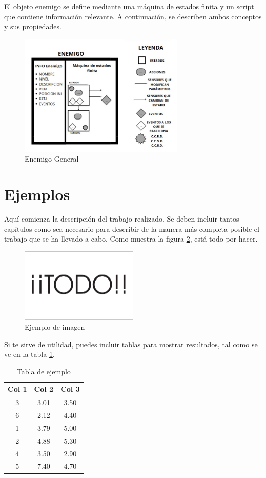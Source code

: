 El objeto enemigo se define mediante una máquina de estados finita y un script que contiene información relevante. A continuación, se describen ambos conceptos y sus propiedades.\\
\begin{figure}[h]
	\centering
	\includegraphics[width = 0.7\textwidth]{Imagenes/EnemigoGeneral.png}
	\caption{Enemigo General }
	\label{fig:EnemigoGeneral}
\end{figure}


\section{Ejemplos}
Aquí comienza la descripción del trabajo realizado. Se deben incluir tantos capítulos como sea necesario para describir de la manera más completa posible el trabajo que se ha llevado a cabo. Como muestra la figura \ref{fig:sampleImage}, está todo por hacer.


\begin{figure}[h]
	\centering
	\includegraphics[width = 0.5\textwidth]{Imagenes/Vectorial/Todo.pdf}
	\caption{Ejemplo de imagen}
	\label{fig:sampleImage}
\end{figure}

Si te sirve de utilidad,  puedes incluir tablas para mostrar resultados, tal como se ve en la tabla \ref{tab:sampleTable}.


\begin{table}
	\centering
	\begin{tabular}{c|c|c}
		\textbf{Col 1} & \textbf{Col 2} & \textbf{Col 3} \\
		\hline\hline
		3 & 3.01 & 3.50\\
		6 & 2.12 & 4.40\\
		1 & 3.79 & 5.00\\
		2 & 4.88 & 5.30\\
		4 & 3.50 & 2.90\\
		5 & 7.40 & 4.70\\
		\hline
	\end{tabular}
	\caption{Tabla de ejemplo}
	\label{tab:sampleTable}
\end{table}
